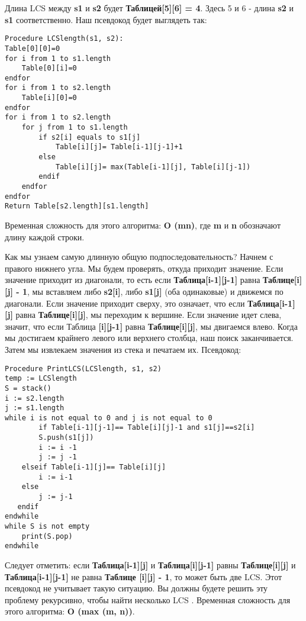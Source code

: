 \vspace{\baselineskip}
Длина LCS между \textbf{s1} и \textbf{s2} будет \textbf{Таблицей[5][6] = 4}. Здесь 5 и 6 - длина \textbf{s2} и \textbf{s1}
соответственно. Наш псевдокод будет выглядеть так:
\vspace{\baselineskip}
\begin{tcolorbox}
\begin{verbatim}     
Procedure LCSlength(s1, s2):
Table[0][0]=0
for i from 1 to s1.length
    Table[0][i]=0
endfor
for i from 1 to s2.length
    Table[i][0]=0
endfor
for i from 1 to s2.length
    for j from 1 to s1.length
        if s2[i] equals to s1[j]
            Table[i][j]= Table[i-1][j-1]+1
        else
            Table[i][j]= max(Table[i-1][j], Table[i][j-1])
        endif
    endfor
endfor
Return Table[s2.length][s1.length]
\end{verbatim}
\end{tcolorbox}
\vspace{\baselineskip}
Временная сложность для этого алгоритма: \textbf{O (mn)}, где \textbf{m} и \textbf{n} обозначают
длину каждой строки.
\vspace{\baselineskip}

Как мы узнаем самую длинную общую подпоследовательность? Начнем с
правого нижнего угла. Мы будем проверять, откуда приходит значение. Если
значение приходит из диагонали, то есть если \textbf{Таблица[i-1][j-1]} равна
\textbf{Таблице[i][j] - 1}, мы вставляем либо \textbf{s2[i]}, либо \textbf{s1[j]} (оба одинаковые) и
движемся по диагонали. Если значение приходит сверху, это означает, что
если \textbf{Таблица[i-1][j]} равна \textbf{Таблице[i][j]}, мы переходим к вершине. Если значение
идет слева, значит, что если Таблица \textbf{[i][j-1]} равна \textbf{Таблице[i][j]}, мы
двигаемся влево. Когда мы достигаем крайнего левого или верхнего столбца,
наш поиск заканчивается. Затем мы извлекаем значения из стека и печатаем
их. Псевдокод:
\vspace{\baselineskip}
\begin{tcolorbox}
\begin{verbatim}     
Procedure PrintLCS(LCSlength, s1, s2)
temp := LCSlength
S = stack()
i := s2.length
j := s1.length
while i is not equal to 0 and j is not equal to 0
        if Table[i-1][j-1]== Table[i][j]-1 and s1[j]==s2[i]
        S.push(s1[j]) 
        i := i -1        
        j := j -1
    elseif Table[i-1][j]== Table[i][j]
        i := i-1
    else
        j := j-1
   endif
endwhile
while S is not empty
    print(S.pop)
endwhile
\end{verbatim}
\end{tcolorbox}
\vspace{\baselineskip}
Следует отметить: если \textbf{Таблица[i-1][j]} и \textbf{Таблица[i][j-1]} равны \textbf{Таблице[i][j]}
и \textbf{Таблица[i-1][j-1]} не равна \textbf{Таблице [i][j] - 1}, то может быть две LCS. Этот
псевдокод не учитывает такую ситуацию. Вы должны будете решить эту
проблему рекурсивно, чтобы найти несколько LCS
\vspace{\baselineskip}
.
Временная сложность для этого алгоритма: \textbf{O (max (m, n))}.

